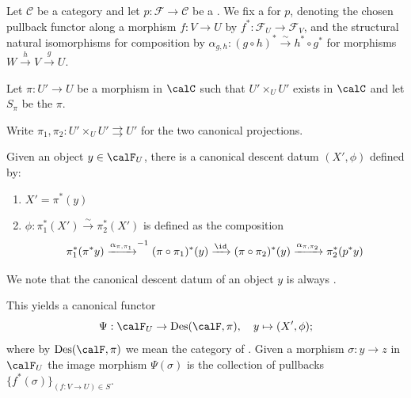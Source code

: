\begin{definition} \label{definition:descent_datum_associated_to_an_object_in_a_category_fibered_in_groupoids_over_a_category_with_respect_to_a_single_morphism}
    Let $\mathcal{C}$ be a category and let $p: \mathcal{F} \to \mathcal{C}$ be a . We fix a  for $p$, denoting the chosen pullback functor along a morphism $f: V \to U$ by $f^*: \mathcal{F}_U \to \mathcal{F}_V$, and the structural natural isomorphisms for composition by $\alpha_{g,h}: (g \circ h)^* \xrightarrow{\sim} h^* \circ g^*$ for morphisms $W \xrightarrow{h} V \xrightarrow{g} U$.

    Let $\pi: U' \to U$ be a morphism in $
    \calC$ such that $U' \times_U U'$  exists in $\calC$ and let $S_\pi$ be the   $\pi$. 

    Write $\pi_1,\pi_2: U' \times_U U' \rightrightarrows U'$ for the two canonical projections.

    Given an object $y \in \calF_U$, there is a canonical descent datum $(X',\phi)$ defined by:
    \begin{enumerate}
        \item $X' = \pi^*(y)$  
        \item $\phi: \pi_1^*(X') \xrightarrow{\sim} \pi_2^*(X')$ is defined as the composition
        $$\pi_1^*(\pi^* y) \xrightarrow{\alpha_{\pi, \pi_1}}^{-1} (\pi \circ \pi_1)^* (y) \xrightarrow{\id} (\pi \circ \pi_2)^*(y) \xrightarrow{\alpha_{\pi, \pi_2}} \pi_2^*(p^* y)$$
    \end{enumerate}

    We note that the canonical descent datum of an object $y$ is always . 
    \TODO{}

    This yields a canonical functor 
    $$\Psi:\calF_U \to \operatorname{Des}(\calF, \pi), \quad y \mapsto (X', \phi);$$
    where by $\operatorname{Des}(\calF, \pi)$ we mean the category of . 
    Given a morphism $\sigma: y \to z$ in $\calF_U$ the image morphism $\Psi(\sigma)$ is the collection of pullbacks $\{f^*(\sigma)\}_{(f:V \to U) \in S}$.

    
\end{definition}